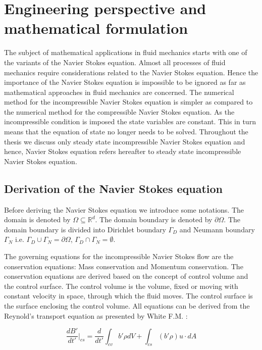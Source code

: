 \documentclass[a4paper]{book}
\begin{document}
\newpage

\chapter[Perspective and formulation]{Engineering perspective and mathematical formulation} 

The subject of mathematical applications in fluid mechanics starts with  one of the variants of the Navier Stokes equation. Almost all processes of fluid mechanics require considerations related to the Navier Stokes equation. Hence the importance of the Navier Stokes equation is impossible to be ignored as far as mathematical approaches in fluid mechanics are concerned. The numerical method for the incompressible Navier Stokes equation is simpler as compared to the numerical method for the compressible Navier Stokes equation. As the incompressible condition is imposed the state variables are constant. This in turn means that the equation of state no longer needs to be solved. Throughout the thesis we discuss only steady state incompressible Navier Stokes equation and hence, Navier Stokes equation refers hereafter to steady state incompressible Navier Stokes equation.

\section[Derivation]{Derivation of the Navier Stokes equation}

Before deriving the Navier Stokes equation we introduce some notations. The domain is denoted by $\Omega \subseteq \mathbb{R}^d $. The domain boundary is denoted by $\partial \Omega$. The domain boundary is divided into Dirichlet boundary $\Gamma_D$ and Neumann boundary $\Gamma_N$ i.e. $\Gamma_D \cup \Gamma_N = \partial \Omega $, $\Gamma_D \cap \Gamma_N = \emptyset $. 

The governing equations for the incompressible Navier Stokes flow are the conservation equations: Mass conservation and Momentum conservation. The conservation equations are derived based on the concept of control volume and the control surface. The control volume is the volume, fixed or moving with constant velocity in space, through which the fluid moves. The control surface is the surface enclosing the control volume. All equations can be derived from the Reynold's transport equation as presented by White F.M. \cite{white}:


\begin{equation} \label{rtt} 
\frac{dB'}{dt'}|_{cs} = \frac{d}{dt'} \int_{cv} b' \rho dV + \int_{cs} (b' \rho) u\cdot dA 
\end{equation}
\end{document}
